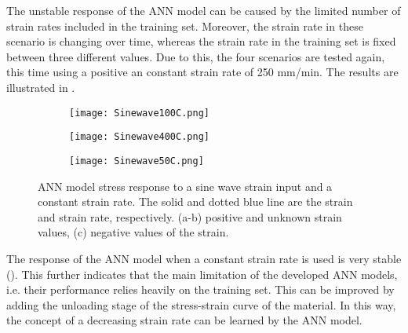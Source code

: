 The unstable response of the ANN model can be caused by the limited number of strain rates included in the training set.  Moreover, the strain rate in these scenario is changing over time, whereas the strain rate in the training set is fixed between three different values. Due to this, the four scenarios are tested again, this time using a positive an constant strain rate of 250 mm/min. The results are illustrated in .

\begin{figure}[htb!]
	\centering
	\begin{subfigure}[b]{0.49\textwidth}
		\centering
		\texttt{[image: Sinewave100C.png]}
		\caption{}
		\label{fig:ANNSineCTesta}
	\end{subfigure}
	\begin{subfigure}[b]{0.49\textwidth}
		\centering
		\texttt{[image: Sinewave400C.png]}
		\caption{}
		\label{fig:ANNSineCTestb}
	\end{subfigure}
	\begin{subfigure}[b]{0.49\textwidth}
		\centering
		\texttt{[image: Sinewave50C.png]}
		\caption{}
		\label{fig:ANNSineCTestc}
	\end{subfigure}	
	\caption{ANN model stress response to a sine wave strain input and a constant strain rate. The solid and dotted blue line are the strain and strain rate, respectively. (a-b) positive and unknown strain values, (c) negative values of the strain.}
	\label{fig:ANNSineCTest}
\end{figure}

The response of the ANN model when a constant strain rate is used is very stable (). This further indicates that the main limitation of the developed ANN models, i.e. their performance relies heavily on the training set. This can be improved by adding the unloading stage of the stress-strain curve of the material. In this way, the concept of a decreasing strain rate can be learned by the ANN model. 

